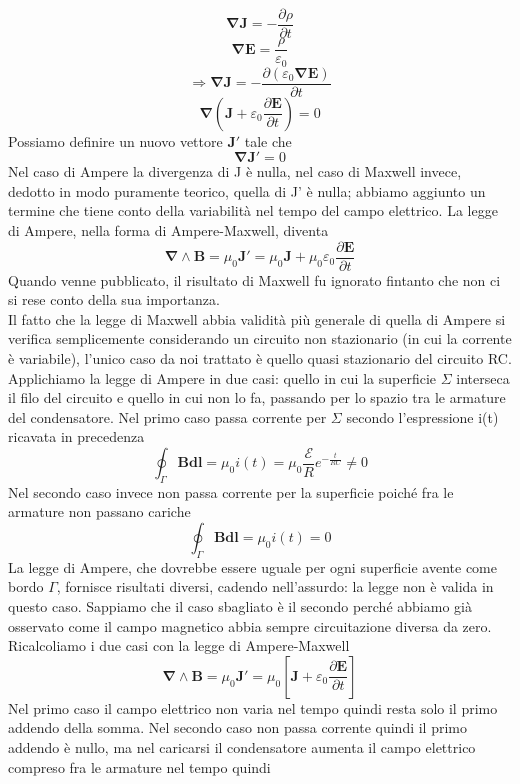 \documentclass[10pt,a4paper]{article}
\begin{document}
\[\mathbf{\nabla}\mathbf{J}=-\frac{\partial \rho}{\partial t}\]
\[\mathbf{\nabla}\mathbf{E}=\frac{ \rho}{\varepsilon_0}\]
\[\Rightarrow \mathbf{\nabla}\mathbf{J}= -\frac{\partial (\varepsilon_0\mathbf{\nabla}\mathbf{E})}{\partial t}\]
\[\mathbf{\nabla}\left(\mathbf{J}+\varepsilon_0\frac{\partial\mathbf{E}}{\partial t}\right) = 0\]
Possiamo definire un nuovo vettore $\mathbf{J'}$ tale che
\[\mathbf{\nabla}\mathbf{J'}=0\]
Nel caso di Ampere la divergenza di J è nulla, nel caso di Maxwell invece, dedotto in modo puramente teorico, quella di J' è nulla; abbiamo aggiunto un termine che tiene conto della variabilità nel tempo del campo elettrico. La legge di Ampere, nella forma di Ampere-Maxwell, diventa
\[\mathbf{\nabla}\wedge\mathbf{B}=\mu_0\mathbf{J'}=\mu_0\mathbf{J}+\mu_0\varepsilon_0\frac{\partial\mathbf{E}}{\partial t}\]
Quando venne pubblicato, il risultato di Maxwell fu ignorato fintanto che non ci si rese conto della sua importanza.\\
Il fatto che la legge di Maxwell abbia validità più generale di quella di Ampere si verifica semplicemente considerando un circuito non stazionario (in cui la corrente è variabile), l'unico caso da noi trattato è quello quasi stazionario del circuito RC. Applichiamo la legge di Ampere in due casi: quello in cui la superficie $\Sigma$ interseca il filo del circuito e quello in cui non lo fa, passando per lo spazio tra le armature del condensatore. Nel primo caso passa corrente per $\Sigma$ secondo l'espressione i(t) ricavata in precedenza
\[\oint_{\Gamma}\mathbf{B}\mathbf{dl}=\mu_0 i(t)= \mu_0 \frac{\mathcal{E}}{R}e^{-\frac{t}{RC}}\neq0\]
Nel secondo caso invece non passa corrente per la superficie poiché fra le armature non passano cariche
\[\oint_{\Gamma}\mathbf{B}\mathbf{dl}=\mu_0 i(t)= 0\]
La legge di Ampere, che dovrebbe essere uguale per ogni superficie avente come bordo $\Gamma$, fornisce risultati diversi, cadendo nell'assurdo: la legge non è valida in questo caso. Sappiamo che il caso sbagliato è il secondo perché abbiamo già osservato come il campo magnetico abbia sempre circuitazione diversa da zero.\\
Ricalcoliamo i due casi con la legge di Ampere-Maxwell
\[\mathbf{\nabla}\wedge\mathbf{B}=\mu_0\mathbf{J'}=\mu_0\left[\mathbf{J}+\varepsilon_0\frac{\partial \mathbf{E}}{\partial t}\right]\]
Nel primo caso il campo elettrico non varia nel tempo quindi resta solo il primo addendo della somma. Nel secondo caso non passa corrente quindi il primo addendo è nullo, ma nel caricarsi il condensatore aumenta il campo elettrico compreso fra le armature nel tempo quindi 
\end{document}
